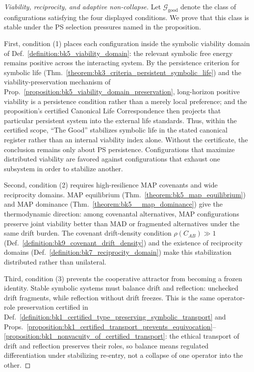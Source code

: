 \begin{proof}[Viability, reciprocity, and adaptive non-collapse]
\label{proof:bk9_stability_conditions_for_the_good}
\leavevmode
Let \(\mathcal{G}_{\mathrm{good}}\) denote the class of configurations satisfying
the four displayed conditions.  We prove that this class is stable under the PS
selection pressures named in the proposition.

First, condition (1) places each configuration inside the symbolic viability
domain of Def.~\ref{definition:bk5_viability_domain}: the relevant symbolic
free energy remains positive across the interacting system.  By the persistence
criterion for symbolic life (Thm.~\ref{theorem:bk3_criteria_persistent_symbolic_life})
and the viability-preservation mechanism of
Prop.~\ref{proposition:bk5_viability_domain_preservation}, long-horizon
positive viability is a persistence condition rather than a merely local
preference; and the proposition's certified Canonical Life Correspondence then projects
that particular persistent system into the external life standards.  Thus,
within the certified scope, ``The Good'' stabilizes symbolic life in the stated
canonical register rather than an internal viability index alone.  Without the
certificate, the conclusion remains only about PS persistence.  Configurations that maximize distributed viability are
favored against configurations that exhaust one subsystem in order to stabilize
another.

Second, condition (2) requires high-resilience MAP covenants and wide
reciprocity domains.  MAP equilibrium (Thm.~\ref{theorem:bk5_map_equilibrium})
and MAP dominance (Thm.~\ref{theorem:bk5__map_dominance}) give the
thermodynamic direction: among covenantal alternatives, MAP configurations
preserve joint viability better than MAD or fragmented alternatives under the
same drift burden.  The covenant drift-density condition
\(\rho(C_{AB})\gg1\) (Def.~\ref{definition:bk9_covenant_drift_density}) and the
existence of reciprocity domains (Def.~\ref{definition:bk7_reciprocity_domain})
make this stabilization distributed rather than unilateral.

Third, condition (3) prevents the cooperative attractor from becoming a frozen
identity.  Stable symbolic systems must balance drift and reflection: unchecked
drift fragments, while reflection without drift freezes.  This is the same
operator-role preservation certified in
Def.~\ref{definition:bk1_certified_type_preserving_symbolic_transport} and
Props.~\ref{proposition:bk1_certified_transport_prevents_equivocation}--\ref{proposition:bk1_nonvacuity_of_certified_transport}: the ethical
transport of drift and reflection preserves their roles, so balance means
regulated differentiation under stabilizing re-entry, not a collapse of one
operator into the other.


\end{proof}
